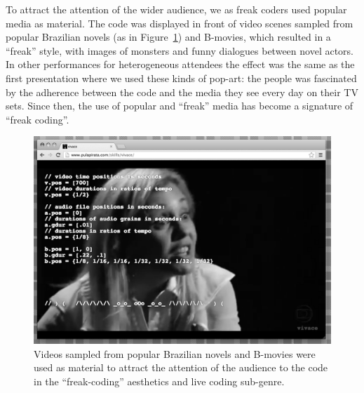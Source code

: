 \documentclass[12pt,times,twocolumn]{article}
\begin{document}
To attract the attention of the wider audience, we as freak coders
used popular media as material. The code was displayed in front of
video scenes sampled from popular Brazilian novels (as in
Figure~\ref{fig:novela}) and B-movies, which resulted in a ``freak'' style,
with images of monsters and funny dialogues between novel actors. In
other performances for heterogeneous attendees the effect was the same
as the first presentation where we used these kinds of pop-art: the
people was fascinated by the adherence between the code and the media
they see every day on their TV sets. Since then, the use of popular and
``freak'' media has become a signature of ``freak coding''.

\begin{figure}[htpb]
  \begin{center}
    \includegraphics[scale=.3]{img/fig_novela_.png}
    \caption{Videos sampled from popular Brazilian novels and B-movies
      were used as material to attract the attention of the audience to the code
	  in the ``freak-coding'' aesthetics and live coding sub-genre.}
    \label{fig:novela}
  \end{center}
\end{figure}
\end{document}
